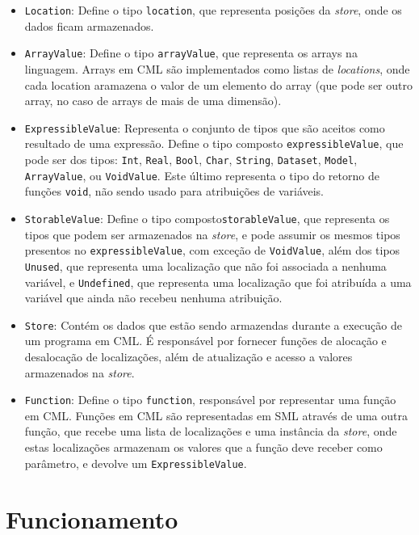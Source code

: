 \documentclass[12pt]{article}
\begin{document}
\begin{itemize}
\item \texttt{Location}: Define o tipo \texttt{location}, que representa posições da \textit{store}, onde os dados ficam armazenados.

\item \texttt{ArrayValue}: Define o tipo \texttt{arrayValue}, que representa os arrays na linguagem. Arrays em CML são implementados como listas de \textit{locations}, onde cada location aramazena o valor de um elemento do array (que pode ser outro array, no caso de arrays de mais de uma dimensão).

\item \texttt{ExpressibleValue}: Representa o conjunto de tipos que são aceitos como resultado de uma expressão. Define o tipo composto \texttt{expressibleValue}, que pode ser dos tipos: \texttt{Int}, \texttt{Real}, \texttt{Bool}, \texttt{Char}, \texttt{String}, \texttt{Dataset}, \texttt{Model}, \texttt{ArrayValue}, ou \texttt{VoidValue}. Este último representa o tipo do retorno de funções \texttt{void}, não sendo usado para atribuições de variáveis.

\item \texttt{StorableValue}: Define o tipo composto\texttt{storableValue}, que representa os tipos que podem ser armazenados na \textit{store}, e pode assumir os mesmos tipos presentos no \texttt{expressibleValue}, com exceção de \texttt{VoidValue}, além dos tipos \texttt{Unused}, que representa uma localização que não foi associada a nenhuma variável, e \texttt{Undefined}, que representa uma localização que foi atribuída a uma variável que ainda não recebeu nenhuma atribuição.

\item \texttt{Store}: Contém os dados que estão sendo armazendas durante a execução de um programa em CML. É responsável por fornecer funções de alocação e desalocação de localizações, além de atualização e acesso a valores armazenados na \textit{store}.

\item \texttt{Function}: Define o tipo \texttt{function}, responsável por representar uma função em CML. Funções em CML são representadas em SML através de uma outra função, que recebe uma lista de localizações e uma instância da \textit{store}, onde estas localizações armazenam os valores que a função deve receber como parâmetro, e devolve um \texttt{ExpressibleValue}.
\end{itemize}

\section{Funcionamento}
\end{document}

